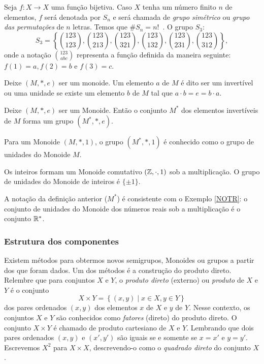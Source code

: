 \begin{exmp}
  Seja $f: X \to X$ uma função bijetiva. Caso $X$ tenha um número finito $n$ de elementos, $f$ será denotada por $S_{n}$ e será chamada de \emph{grupo simétrico} ou \emph{grupo das permutações} de $n$ letras. Temos que $\#S_{n} = n!$\ .\newline
  O grupo $S_{3}$: $$S_{3} = \left\{\binom{123}{123}, \binom{123}{213}, \binom{123}{321}, \binom{123}{132}, \binom{123}{231}, \binom{123}{312}  \right\},$$
  onde a notação $\binom{123}{abc}$ representa a função definida da maneira seguinte: $f(1) = a, f(2) = b$ e $f(3) = c$.
\end{exmp}

\begin{definition}
  Deixe $(M,*,e)$ ser um monoide. Um elemento $a$ de $M$ é dito ser um invertível ou uma unidade se existe um elemento $b$ de $M$ tal que $a\cdot b = e = b\cdot a$.
\end{definition}
\begin{stat}
  Deixe $(M,*,e)$ ser um Monoide. Então o conjunto $M^*$ dos elementos invertíveis de $M$ forma um grupo $(M^*,*,e)$.
\end{stat}
\begin{definition}
  Para um Monoide $(M,*,1)$, o grupo $(M^*,*,1)$ é conhecido como o grupo de unidades do Monoide $M$.
\end{definition}
\begin{exmp}
  Os inteiros formam um Monoide comutativo $(\mathbb{Z},\cdot , 1)$ sob a multiplicação. O grupo de unidades do Monoide de inteiros é $\{\pm 1\}$.
\end{exmp}
\begin{exmp}
  A notação da definição anterior ($M^*$) é consistente com o Exemplo \ref{NOTR}: o conjunto de unidades do Monoide dos números reais sob a multiplicação é o conjunto $\mathbb{R}^*$.
\end{exmp}

\subsubsection{Estrutura dos componentes}
Existem métodos para obtermos novos semigrupos, Monoides ou grupos a partir dos que foram dados. Um dos métodos é a construção do produto direto. Relembre que para conjuntos $X$ e $Y$, o \emph{produto direto} (externo) ou \emph{produto} de $X$ e $Y$ é o conjunto
$$X \times Y = \left\{(x,y) \mid x \in X , y \in Y\right\}$$ dos pares ordenados $(x,y)$ dos elementos $x$ de $X$ e $y$ de $Y$. Nesse contexto, os conjuntos $X$ e $Y$ são conhecidos como \emph{fatores} (direto) do produto direto. O conjunto $X\times Y$ é chamado de produto cartesiano de $X$ e $Y$. Lembrando que dois pares ordenados $(x,y)$ e $(x',y')$ são iguais se e somente se $x=x'$ e $y=y'$. Escrevemos $X^{2}$ para $X\times X$, descrevendo-o como o \emph{quadrado direto} do conjunto $X$.

